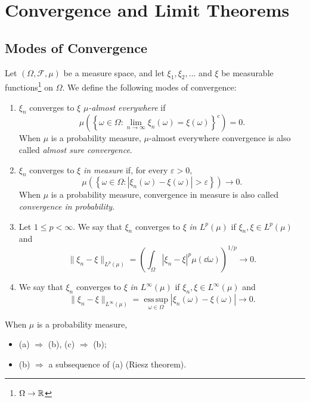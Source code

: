 \chapter{Convergence and Limit Theorems}

\section{Modes of Convergence}

\begin{definitionbox}
    Let $(\Omega, \mathcal{F}, \mu)$ be a measure space, and let
    $\xi_1, \xi_2, \ldots$ and $\xi$ be measurable functions\footnote{$\Omega \rightarrow \mathbb{R}$} on $\Omega$.
    We define the following modes of convergence:
    \begin{enumerate}[label=(\alph*)]
        \item $\xi_n$ converges to $\xi$ \emph{$\mu$-almost everywhere} if
        $$\mu\left(\left\{\omega \in \Omega :
        \lim_{n\to\infty}\xi_n(\omega)=\xi(\omega)\right\}^{c}\right)=0.$$
        When $\mu$ is a probability measure, $\mu$-almost everywhere
        convergence is also called \emph{almost sure convergence}.

        \item $\xi_n$ converges to $\xi$ \emph{in measure} if, for every
        $\varepsilon>0$,
        $$\mu\left(\left\{\omega\in\Omega:
        |\xi_n(\omega)-\xi(\omega)|>\varepsilon\right\}\right)
        \longrightarrow 0.$$
        When $\mu$ is a probability measure, convergence in measure is also
        called \emph{convergence in probability}.

        \item Let $1\leq p<\infty$. We say that $\xi_n$ converges to $\xi$
        \emph{in $L^p(\mu)$} if $\xi_n,\xi\in L^p(\mu)$ and
        $$\|\xi_n-\xi\|_{L^p(\mu)}
        =\left(\int_{\Omega}|\xi_n-\xi|^p\mu(\dd\omega)\right)^{1/p}
        \longrightarrow 0.$$

        \item We say that $\xi_n$ converges to $\xi$ \emph{in
        $L^\infty(\mu)$} if $\xi_n,\xi\in L^\infty(\mu)$ and
        $$\|\xi_n-\xi\|_{L^\infty(\mu)}
        =\operatorname*{ess\,sup}_{\omega\in\Omega}
        |\xi_n(\omega)-\xi(\omega)|
        \longrightarrow 0.$$
    \end{enumerate}
\end{definitionbox}
\begin{remarkbox}
    When $\mu$ is a probability measure,
    \begin{itemize}
        \item (a) $\Rightarrow$ (b), (c) $\Rightarrow$ (b);
        \item (b) $\Rightarrow$ a subsequence of (a) (Riesz theorem).
    \end{itemize}
\end{remarkbox}

